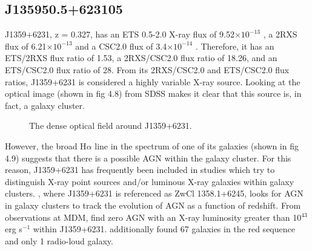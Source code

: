 \subsection{J135950.5+623105}

J1359+6231, z = 0.327, has an ETS 0.5-2.0 X-ray flux of 9.52$\times 10^{-13}$  \fluxunits, a 2RXS flux of 6.21$\times 10^{-13}$ \fluxunits and a CSC2.0 flux of 3.4$\times 10^{-14}$ \fluxunits. 
Therefore, it has an ETS/2RXS flux ratio of 1.53, a 2RXS/CSC2.0 flux ratio of 18.26, and an ETS/CSC2.0 flux ratio of 28. 
From its 2RXS/CSC2.0 and ETS/CSC2.0 flux ratios, J1359+6231 is considered a highly variable X-ray source.
Looking at the optical image (shown in fig 4.8) from SDSS makes it clear that this source is, in fact, a galaxy cluster. 

\begin{figure}[h]
\centering
{}
\caption{The dense optical field around J1359+6231. }
\label{imbeded_fb}
\end{figure}


However, the broad H$\alpha$ line in the spectrum of one of its galaxies  (shown in fig 4.9) suggests that there is a possible AGN within the galaxy cluster. 
For this reason, J1359+6231 has frequently been included in studies which try to distinguish X-ray point sources and/or luminous X-ray galaxies within galaxy clusters. 
\cite{martini2009}, where J1359+6231 is referenced as ZwCl 1358.1+6245, looks for AGN in galaxy clusters to track the evolution of AGN as a function of redshift.
From observations at MDM, \cite{martini2009} find zero AGN with an X-ray luminosity greater than 10$^{43}$ erg s$^{-1}$ within J1359+6231. 
\cite{hart2009} additionally found 67 galaxies in the red sequence and only 1 radio-loud galaxy.


